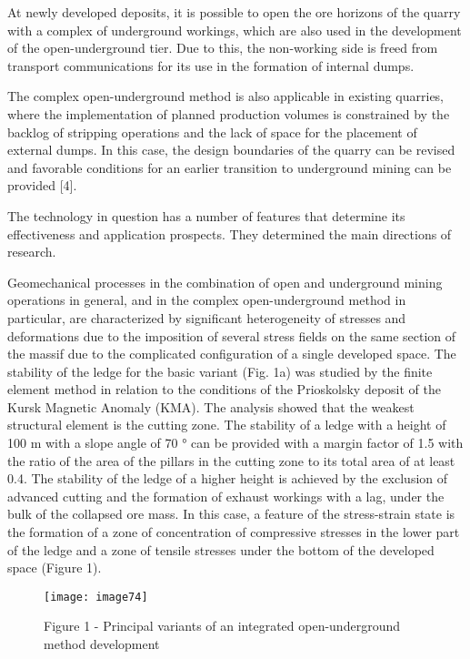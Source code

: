 \begin{multicols}{2}
At newly developed deposits, it is possible to open the ore horizons of
the quarry with a complex of underground workings, which are also used
in the development of the open-underground tier. Due to this, the
non-working side is freed from transport communications for its use in
the formation of internal dumps.

The complex open-underground method is also applicable in existing
quarries, where the implementation of planned production volumes is
constrained by the backlog of stripping operations and the lack of space
for the placement of external dumps. In this case, the design boundaries
of the quarry can be revised and favorable conditions for an earlier
transition to underground mining can be provided {[}4{]}.

The technology in question has a number of features that determine its
effectiveness and application prospects. They determined the main
directions of research.

Geomechanical processes in the combination of open and underground
mining operations in general, and in the complex open-underground method
in particular, are characterized by significant heterogeneity of
stresses and deformations due to the imposition of several stress fields
on the same section of the massif due to the complicated configuration
of a single developed space. The stability of the ledge for the basic
variant (Fig. 1a) was studied by the finite element method in relation
to the conditions of the Prioskolsky deposit of the Kursk Magnetic
Anomaly (KMA). The analysis showed that the weakest structural element
is the cutting zone. The stability of a ledge with a height of 100 m
with a slope angle of 70 ° can be provided with a margin factor of 1.5
with the ratio of the area of the pillars in the cutting zone to its
total area of at least 0.4. The stability of the ledge of a higher
height is achieved by the exclusion of advanced cutting and the
formation of exhaust workings with a lag, under the bulk of the
collapsed ore mass. In this case, a feature of the stress-strain state
is the formation of a zone of concentration of compressive stresses in
the lower part of the ledge and a zone of tensile stresses under the
bottom of the developed space (Figure 1).
\end{multicols}

\begin{figure}[H]
    \centering
    \texttt{[image: image74]}
    \caption*{a - without loading the sides and ledge with rock mass; b - with
partial loading of the ledge with broken rock; c - with the completion
of deep horizons in an open way without additional separation of the
sides of the quarry; d, е - with full loading of the ledge and sides of
the worked space, respectively, with bottom and end ore release; 1 -
non-working side of the quarry; 2 - internal dump; 3 - ore mass; 4 -
ledge of the open-underground tier; 5 - working side of the quarry; 6
- parallel descending wells; 7 - output workings;
8 - loading of the ledge; 9 - fan wells}
    \caption*{Figure 1 - Principal variants of an integrated open-underground method development}
\end{figure}

